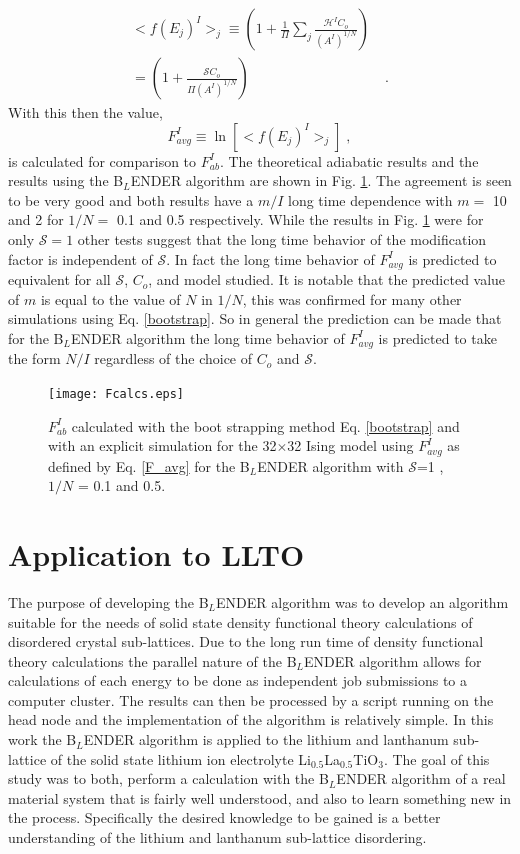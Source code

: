 \documentclass[aps,pre,reprint,superscriptaddress,showkeys]{revtex4-2}
\begin{document}
\begin{equation}
\begin{split}
 <f(E_j)^I>_j  \equiv (1 + \frac{1}{\Pi}\sum_j\frac{\mathcal{H}^IC_o}{(A^I)^{1/N}})\\
 = (1 + \frac{\mathcal{S}C_o}{\Pi(A^I)^{1/N}})& \;.
 \end{split}
 \label{calcmodfactor}
 \end{equation} 
  With this then the value,
 \begin{equation}
  F_{avg}^I\equiv \ln[<f(E_j)^I>_j]\;,
  \label{F_avg}
  \end{equation}
  is  calculated for comparison to $F_{ab}^I$.   The theoretical adiabatic results and the results using the B$_L$ENDER algorithm are shown in Fig. \ref{fcalcs}.   The agreement is seen to be very good and both results have a $m/I$ long time dependence with $m=$ 10 and 2  for $1/N=$ 0.1 and 0.5 respectively. While the results in Fig. \ref{fcalcs} were for only $\mathcal{S}=1$ other tests suggest that the long time behavior of the modification factor is independent of $\mathcal{S}$. In fact the long time behavior of $F_{avg}^I$ is predicted to equivalent for all $\mathcal{S}$, $C_o$,  and model studied.  It is notable that the predicted value of $m$ is equal to the value of $N$ in $1/N$, this was confirmed for many other simulations using Eq. \ref{bootstrap}. So in general the prediction can be made that for the B$_L$ENDER algorithm the long time behavior of $F_{avg}^I$ is predicted to take the form $N/I$ regardless of the choice of $C_o$ and $\mathcal{S}$. 
\begin{figure}
\texttt{[image: Fcalcs.eps]}
\caption{$F_{ab}^I$ calculated with the boot strapping method Eq. \ref{bootstrap} and with an explicit simulation for the 32$\times$32 Ising model using $F_{avg}^I$ as defined by Eq. \ref{F_avg} for the B$_L$ENDER algorithm with $\mathcal{S}$=1 , $1/N$ = 0.1  and 0.5.            \label{fcalcs}}
\end{figure}

\section{Application to LLTO}
\label{sec4}
The purpose of developing the B$_L$ENDER algorithm was to develop an algorithm suitable for the needs of solid state density functional theory calculations of disordered crystal sub-lattices.  Due to the long run time of density functional theory calculations  the parallel nature of the B$_L$ENDER algorithm allows for calculations of each energy to be done as independent job submissions to a computer cluster. The results can then be processed by a script running on the head node and the implementation of the algorithm is relatively simple.  In this work the B$_L$ENDER algorithm is applied to the lithium and lanthanum sub-lattice of the solid state lithium ion electrolyte  Li$_{0.5}$La$_{0.5}$TiO$_{3}$. The goal of this study was to both, perform a calculation with the B$_L$ENDER algorithm  of a real material system that is fairly well understood, and also to learn something new in the process.  Specifically the desired knowledge to be gained is a better understanding of the lithium and lanthanum sub-lattice disordering. 
\end{document}
